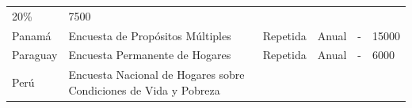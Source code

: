 \begin{longtable}[]{@{}llllll@{}}
\begin{minipage}[t]{0.06\columnwidth}
20\%\strut
\end{minipage} & \begin{minipage}[t]{0.13\columnwidth}\raggedright
7500\strut
\end{minipage}\tabularnewline
\begin{minipage}[t]{0.13\columnwidth}\raggedright
Panamá\strut
\end{minipage} & \begin{minipage}[t]{0.38\columnwidth}\raggedright
Encuesta de Propósitos Múltiples\strut
\end{minipage} & \begin{minipage}[t]{0.06\columnwidth}\raggedright
Repetida\strut
\end{minipage} & \begin{minipage}[t]{0.08\columnwidth}\raggedright
Anual\strut
\end{minipage} & \begin{minipage}[t]{0.06\columnwidth}\raggedright
-\strut
\end{minipage} & \begin{minipage}[t]{0.13\columnwidth}\raggedright
15000\strut
\end{minipage}\tabularnewline
\begin{minipage}[t]{0.13\columnwidth}\raggedright
Paraguay\strut
\end{minipage} & \begin{minipage}[t]{0.38\columnwidth}\raggedright
Encuesta Permanente de Hogares\strut
\end{minipage} & \begin{minipage}[t]{0.06\columnwidth}\raggedright
Repetida\strut
\end{minipage} & \begin{minipage}[t]{0.08\columnwidth}\raggedright
Anual\strut
\end{minipage} & \begin{minipage}[t]{0.06\columnwidth}\raggedright
-\strut
\end{minipage} & \begin{minipage}[t]{0.13\columnwidth}\raggedright
6000\strut
\end{minipage}\tabularnewline
\begin{minipage}[t]{0.13\columnwidth}\raggedright
Perú\strut
\end{minipage} & \begin{minipage}[t]{0.38\columnwidth}\raggedright
Encuesta Nacional de Hogares sobre Condiciones de Vida y Pobreza\strut
\end{minipage} & \begin{minipage}[t]{0.06\columnwidth}\raggedright

\end{minipage}
\end{longtable}
